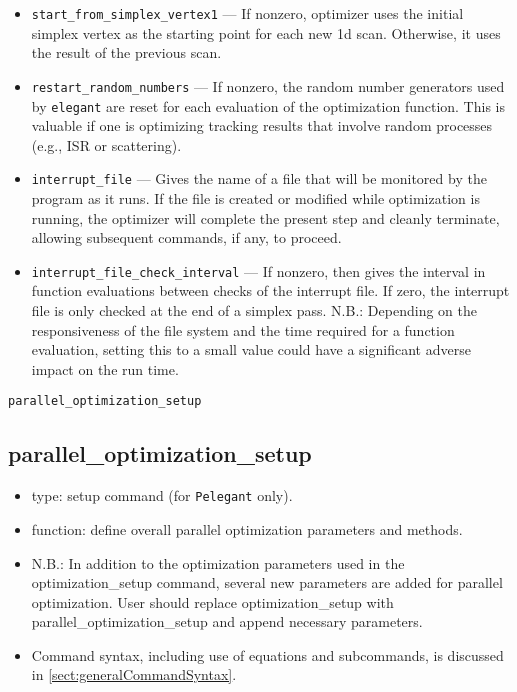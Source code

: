 \documentclass[11pt]{article}
\begin{document}
\begin{itemize}
\item \verb|start_from_simplex_vertex1| --- If nonzero, optimizer uses the initial simplex vertex as the
 starting point for each new 1d scan.  Otherwise, it uses the result of the previous scan.

\item \verb|restart_random_numbers| --- If nonzero, the random number generators used by {\tt elegant} are
 reset for each evaluation of the optimization function.  This is valuable if one is optimizing tracking
 results that involve random processes (e.g., ISR or scattering).

\item \verb|interrupt_file| --- Gives the name of a file that will be monitored by the program as it runs.
  If the file is created or modified while optimization is running, the optimizer will complete the present
  step and cleanly terminate, allowing subsequent commands, if any, to proceed.
\item \verb|interrupt_file_check_interval| --- If nonzero, then gives the interval in function evaluations between
  checks of the interrupt file. If zero, the interrupt file is only
  checked at the end of a simplex pass.
  N.B.: Depending on the responsiveness of the file system and the time required for a function evaluation, setting
  this to a small value could have a significant adverse impact on the run time. 
\end{itemize}

\newpage
\begin{center}{\Large\verb|parallel_optimization_setup|}\end{center}
\subsection{parallel\_optimization\_setup \label{subsec:paralleloptimizationsetup}}

\begin{itemize}
\item type: setup command (for {\tt Pelegant} only).
\item function: define overall parallel optimization parameters and methods.
\item N.B.: In addition to the optimization parameters used in the optimization\_setup command, 	    
      several new parameters are added for parallel optimization. User should replace 
      optimization\_setup with parallel\_optimization\_setup and append necessary parameters. 
\item Command syntax, including use of equations and subcommands, is discussed in \ref{sect:generalCommandSyntax}.
\end{itemize}
\end{document}
